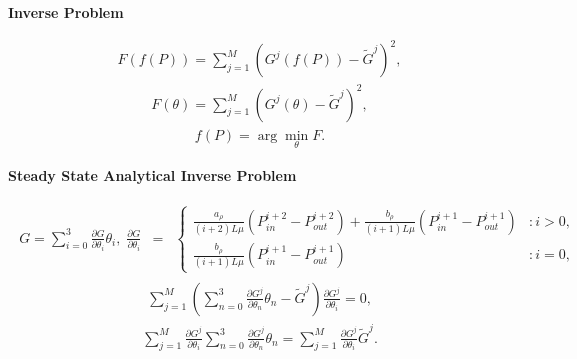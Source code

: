 \documentclass[a4paper,12pt]{extreport}
\begin{document}
\begin{multicols}{2}
\columnbreak

\begin{center}
{\large \textbf{Inverse Problem}}
\end{center}
%
\begin{eqnarray}
\label{eq:functional}
F\left(f\left(P\right)\right) =\sum_{j=1}^M \left(G^j\left(f\left(P\right)\right) - \tilde{G}^j\right)^2,
\end{eqnarray}
%
\begin{eqnarray}
\label{eq:functional_parameters}
F\left(\theta\right) =\sum_{j=1}^M \left(G^j\left(\theta\right) - \tilde{G}^j\right)^2,
\end{eqnarray}
%
\begin{eqnarray}
\label{eq:minimization_functional_parameters}
f(P) = \arg  \min_{\theta}  F.
\end{eqnarray}

\end{multicols}

\begin{center}
{\large \textbf{Steady State Analytical Inverse Problem}}
\end{center}
%
\begin{eqnarray}
\label{eq:consumption_poisson_diff_particular_d}
    \begin{matrix}
   G = \sum \limits_{i=0}^{3} \frac{\partial G}{\partial \theta_i}\theta_i, \;
   \frac{\partial G}{\partial \theta_{i}}& =
    & \left\{
    \begin{matrix}
    \frac{a_{\rho}}{\left(i+2\right) L\mu} \left(P_{in}^{i+2} -P_{out}^{i+2} \right)+
    \frac{b_{\rho}}{\left(i+1\right)L\mu} \left(P_{in}^{i+1} -P_{out}^{i+1} \right) & : i > 0, \\
    \frac{b_{\rho}}{\left(i+1\right)L\mu} \left(P_{in}^{i+1} -P_{out}^{i+1} \right) & : i = 0,
    \end{matrix} \right.
    \end{matrix}
\end{eqnarray}
%
\begin{eqnarray}
\label{eq:least_squares_analytical_1}
\sum_{j=1}^M \left(\sum_{n=0}^{3} \frac{\partial G^j}{\partial \theta_n}\theta_n - \tilde{G}^j\right)\frac{\partial G^j}{\partial \theta_i} = 0,
\end{eqnarray}
%
\begin{eqnarray}
\label{eq:least_squares_analytical_2}
\sum_{j=1}^M \frac{\partial G^j}{\partial \theta_i} \sum_{n=0}^{3} \frac{\partial G^j}{\partial \theta_n}\theta_n =\sum_{j=1}^M \frac{\partial G^j}{\partial \theta_i} \tilde{G}^j.
\end{eqnarray}
\end{document}
